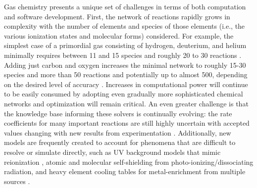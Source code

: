 Gas chemistry presents a unique set of challenges in terms of
both computation and software development.  First, the network of
reactions rapidly grows in complexity with the number of elements and
species of those elements (i.e., the various ionization states and
molecular forms) considered.  For example, the simplest case of a
primordial gas consisting of hydrogen, deuterium, and helium minimally
requires between 11 and 15 species and roughly 20 to 30 reactions
\citep{1997NewA....2..181A, 1998A&A...335..403G}.
Adding just carbon and oxygen increases the minimal network to 
roughly 15-30 species and more than 50 reactions
and potentially up to almost 500, depending on the desired level of
accuracy \citep{2005ApJ...626..627O, 2012MNRAS.421..116G}.  Increases in
computational power will continue to be easily consumed by adopting
even gradually more sophisticated chemical networks and optimization
will remain critical.  An even greater challenge is that the
knowledge base
informing these solvers is continually evolving: the rate
coefficients for many important reactions are still highly uncertain
\citep{2008MNRAS.388.1627G, 2011ApJ...726...55T} with accepted values
changing with new results from experimentation
\citep{2010Sci...329...69K, 2015ApJS..219....6O, 2016ApJ...816...31D}.
Additionally, new models are frequently created to account for
phenomena that are difficult to resolve or simulate directly, such as
UV background models that mimic reionization
\citep[e.g.,][]{1996ApJ...461...20H, 2001cghr.confE..64H,
2012ApJ...746..125H, 2009ApJ...703.1416F}, atomic
\citep{2013MNRAS.430.2427R} and molecular \citep{1996ApJ...468..269D,
2012MNRAS.425L..51W} self-shielding from photo-ionizing/dissociating
radiation, and heavy element cooling tables for metal-enrichment from
multiple sources \citep[e.g.,][]{2009MNRAS.393...99W,
2013MNRAS.433.3005D}.

